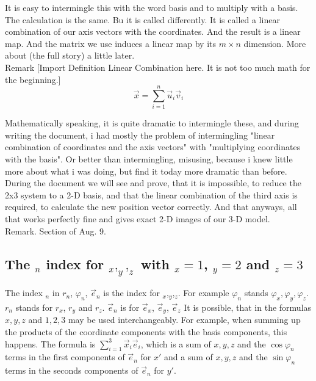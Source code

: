 \documentclass[a4paper]{article}
\begin{document}
It is easy to intermingle this with the word basis and to multiply with a basis. The calculation is the same. Bu it is called differently. It is called a linear combination of our axis vectors with the coordinates. And the result is a linear map. And the matrix we use induces a linear map by its $m\times n$ dimension. More about (the full story) a little later.\\

Remark [Import Definition Linear Combination here. It is not too much math for the beginning.]\\
\begin{displaymath}
\vec{x}=\sum_{i=1}^{n}\vec{u}_{i}\vec{v}_{i}
\end{displaymath}

Mathematically speaking, it is quite dramatic to intermingle these, and during writing the document, i had mostly the problem of intermingling "linear combination of coordinates and the axis vectors" with "multiplying coordinates with the basis". Or better than intermingling, misusing, because i knew little more about what i was doing, but find it today more dramatic than before.\\

During the document we will see and prove, that it is impossible, to reduce the 2x3 system to a 2-D basis, and that the linear combination of the third axis is required, to calculate the new position vector correctly. And that anyways, all that works perfectly fine and gives exact 2-D images of our 3-D model.\\

Remark. Section of Aug. 9. 

\subsection{The $_{n}$ index for $_x,_y,_z$ with $_x=1$, $_y=2$ and $_z=3$}

The index $_{n}$ in $r_{n}$, $\varphi_{n}$, $\vec{e}_{n}$ is the index for $_x$,$_y$,$_z$. For example $\varphi_{n}$  stands $\varphi_x, \varphi_y, \varphi_z$. $r_{n}$ stands for $r_x$, $r_y$ and $r_z$. $\vec{e}_{n}$ is for $\vec{e}_x$, $\vec{e}_y$, $\vec{e}_z$ It is possible, that in the formulas $x,y,z$ and $1,2,3$ may be used interchangeably. For example, when summing up the products of the coordinate components with the basis components, this happens. The formula is $\sum_{i=1}^{3}\vec{x}_{i}\vec{e}_{i}$, which is a sum of $x,y,z$ and the $\cos \varphi_{n}$ terms in the first components of $\vec{e}_{n}$ for $x'$ and a sum of $x,y,z$ and the $\sin \varphi_{n}$ terms in the seconds components of $\vec{e}_{n}$ for $y'$.\\
\end{document}
